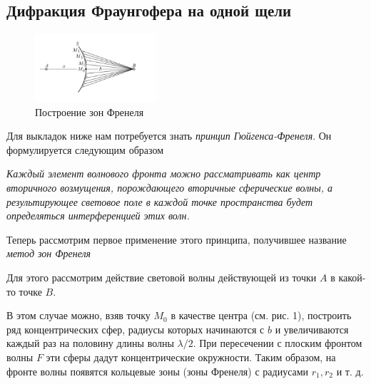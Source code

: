 \newpage

\subsection*{Дифракция Фраунгофера на одной щели}

\begin{figure}
  \begin{center}
    \includegraphics[width = 0.4\textwidth]{2.png}
  \end{center}
  \caption{Построение зон Френеля}
\end{figure}
Для выкладок ниже нам потребуется знать \textit{принцип Гюйгенса-Френеля}. Он формулируется следующим образом 

\textit{Каждый элемент волнового фронта можно рассматривать как центр  вторичного возмущения, порождающего вторичные сферические волны, а результирующее световое поле  в каждой точке пространства будет определяться интерференцией этих волн.}

Теперь рассмотрим первое применение этого принципа, получившее название \textit{метод зон Френеля}

Для этого рассмотрим действие световой волны действующей из точки $A$ в какой-то точке $B$.

В этом случае можно, взяв точку $M_0$ в качестве центра (см. рис. 1), построить ряд концентрических сфер, радиусы которых начинаются с $b$ и увеличиваются каждый раз на половину длины волны $\lambda/2$. При пересечении с плоским фронтом волны $F$ эти сферы дадут концентрические окружности. Таким образом, на фронте волны появятся кольцевые зоны (зоны Френеля) с радиусами $r_1, r_2$ и т. д.

